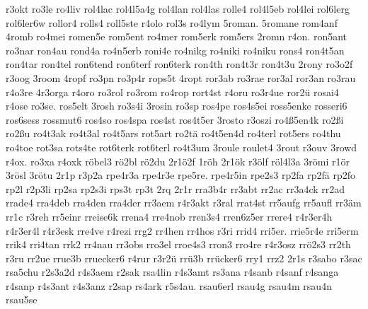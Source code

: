 {    r3okt
    ro3le
    ro4liv
    rol4lac
    rol4l5a4g
    rol4lan
    rol4las
    rolle4
    rol4l5eb
    rol4lei
    rol6lerg
    rol6ler6w
    rollor4
    rolls4
    roll5ste
    r4olo
    rol3s
    ro4lym
    5roman.
    5romane
    rom4anf
    4romb
    ro4mei
    romen5e
    rom5ent
    ro4mer
    rom5erk
    rom5ers
    2romn
    r4on.
    ron5ant
    ro3nar
    ron4au
    rond4a
    ro4n5erb
    roni4e
    ro4nikg
    ro4niki
    ro4niku
    rons4
    ron4t5an
    ron4tar
    ron4tel
    ron6tend
    ron6terf
    ron6terk
    ron4th
    ron4t3r
    ron4t3u
    2rony
    ro3o2f
    r3oog
    3room
    4ropf
    ro3pn
    ro3p4r
    rops5t
    4ropt
    ror3ab
    ro3rae
    ror3al
    ror3an
    ro3rau
    r4o3re
    4r3orga
    r4oro
    ro3rol
    ro3rom
    ro4rop
    rort4st
    r4oru
    ro3r4ue
    ror2ü
    rosai4
    r4ose
    ro3se.
    ros5elt
    3rosh
    ro3s4i
    3rosin
    ro3sp
    ros4pe
    ros4s5ei
    ross5enke
    rosseri6
    ros6sess
    rossmut6
    ros4so
    ros4spa
    ros4st
    ros4t5er
    3rosto
    r3oszi
    ro4ß5en4k
    ro2ßi
    ro2ßu
    ro4t3ak
    ro4t3al
    ro4t5ars
    rot5art
    ro2tä
    ro4t5en4d
    ro4terl
    rot5ers
    ro4thu
    ro4toe
    rot3sa
    rots4te
    rot6terk
    rot6terl
    ro4t3um
    3roule
    roulet4
    3rout
    r3ouv
    3rowd
    r4ox.
    ro3xa
    r4oxk
    röbel3
    rö2bl
    rö2du
    2r1ö2f
    1röh
    2r1ök
    r3ölf
    röl4l3a
    3römi
    r1ör
    3rösl
    3rötu
    2r1p
    r3p2a
    rpe4r3a
    rpe4r3e
    rpe5re.
    rpe4r5in
    rpe2s3
    rp2fa
    rp2fä
    rp2fo
    rp2l
    r2p3li
    rp2sa
    rp2s3i
    rps3t
    rp3t
    2rq
    2r1r
    rra3b4r
    rr3abt
    rr2ac
    rr3a4ck
    rr2ad
    rrade4
    rra4deb
    rra4den
    rra4der
    rr3aem
    r4r3akt
    r3ral
    rrat4st
    rr5aufg
    rr5aufl
    rr3äm
    rr1c
    r3reh
    rr5einr
    rreise6k
    rrena4
    rre4nob
    rren3s4
    rren6z5er
    rrere4
    r4r3er4h
    r4r3er4l
    r4r3esk
    rre4ve
    r4rezi
    rrg2
    rr4hen
    rr4hos
    r3ri
    rrid4
    rri5er.
    rrie5r4e
    rri5erm
    rrik4
    rri4tan
    rrk2
    rr4nau
    rr3obs
    rro3el
    rroe4s3
    rron3
    rro4re
    r4r3osz
    rrö2s3
    rr2th
    r3ru
    rr2ue
    rrue3b
    rruecker6
    r4rur
    r3r2ü
    rrü3b
    rrücker6
    rry1
    rrz2
    2r1s
    r3sabo
    r3sac
    rsa5chu
    r2s3a2d
    r4s3aem
    r2sak
    rsa4lin
    r4s3amt
    rs3ana
    r4sanb
    r4sanf
    r4sanga
    r4sanp
    r4s3ant
    r4s3anz
    r2sap
    rs4ark
    r5s4au.
    rsau6erl
    rsau4g
    rsau4m
    rsau4n
    rsau5se
}
